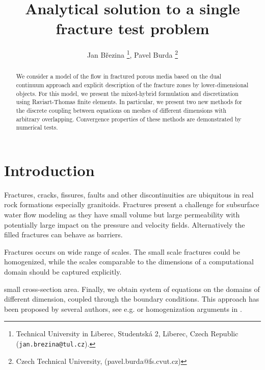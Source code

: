 \documentclass[a4paper,10pt]{article}
\title{Analytical solution to a single fracture test problem
}
\author{%
Jan B\v rezina
\thanks{Technical University in Liberec, Studentsk\'a 2, Liberec, Czech Republic ({\tt jan.brezina@tul.cz}).},
Pavel Burda
\thanks{Czech Technical University, (pavel.burda@fs.cvut.cz)}
}
\begin{document}
\maketitle

\begin{abstract}
We consider a model of the flow in fractured porous media based on the dual continuum approach and 
explicit description of the fracture zones by lower-dimensional objects. For this model, we 
present the mixed-hybrid formulation and discretization using Raviart-Thomas finite elements. 
In particular, we present two new methods for the discrete coupling between equations on meshes of different dimensions
with arbitrary overlapping. Convergence properties of these methods are demonstrated by numerical tests.
\end{abstract}





\section{Introduction}
Fractures, cracks, fissures, faults and other discontinuities are ubiquitous in real rock formations especially granitoids.  
Fractures present a challenge for subsurface water flow modeling as they have small volume but large permeability with
potentially large impact on the pressure and velocity fields. Alternatively the filled fractures can behave as barriers. 

Fractures occurs on wide range of scales. The small scale fractures could be homogenized, while the scales comparable to 
the dimensions of a computational domain should be captured explicitly.



small cross-section area. Finally, we obtain system of equations on the domains of different dimension, coupled through the boundary 
conditions. This approach has been proposed by several authors, see e.g. \cite{reichenberger_mixed-dimensional_2006} or
homogenization arguments in \cite{martin_modeling_2005}.  
\end{document}

